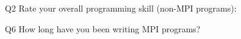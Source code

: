 \begin{description}%
\item{Q2} Rate your overall programming skill (non-MPI programs):%
\item{Q6} How long have you been writing MPI programs?%
\end{description}%
